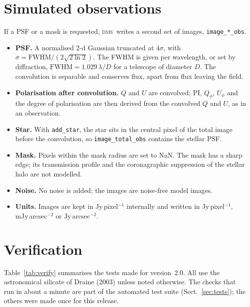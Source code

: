 \documentclass[11pt,a4paper]{article}
\newcommand{\dms}{\textsc{dms}}
\newcommand{\code}[1]{\texttt{#1}}
\begin{document}
\section{Simulated observations}
\label{sec:obs}

If a PSF or a mask is requested, \dms\ writes a second set of images, \code{image\_*\_obs}.
\begin{itemize}
\item \textbf{PSF.} A normalised 2-d Gaussian truncated at $4\sigma$, with
      $\sigma=\mathrm{FWHM}/(2\sqrt{2\ln2})$. The FWHM is given per wavelength, or set by
      diffraction, $\mathrm{FWHM}=1.029\,\lambda/D$ for a telescope of diameter $D$. The
      convolution is separable and conserves flux, apart from flux leaving the field.
\item \textbf{Polarisation after convolution.} $Q$ and $U$ are convolved; $\mathrm{PI}$,
      $Q_\phi$, $U_\phi$ and the degree of polarisation are then derived from the convolved $Q$
      and $U$, as in an observation.
\item \textbf{Star.} With \code{add\_star}, the star sits in the central pixel of the total image
      before the convolution, so \code{image\_total\_obs} contains the stellar PSF.
\item \textbf{Mask.} Pixels within the mask radius are set to NaN. The mask has a sharp edge; its
      transmission profile and the coronagraphic suppression of the stellar halo are not modelled.
\item \textbf{Noise.} No noise is added; the images are noise-free model images.
\item \textbf{Units.} Images are kept in Jy\,pixel$^{-1}$ internally and written in
      Jy\,pixel$^{-1}$, mJy\,arcsec$^{-2}$ or Jy\,arcsec$^{-2}$.
\end{itemize}

\section{Verification}
\label{sec:verify}

Table~\ref{tab:verify} summarises the tests made for version~2.0. All use the astronomical
silicate of Draine (2003) unless noted otherwise. The checks that run in about a minute are part of
the automated test suite (Sect.~\ref{sec:tests}); the others were made once for this release.
\end{document}
